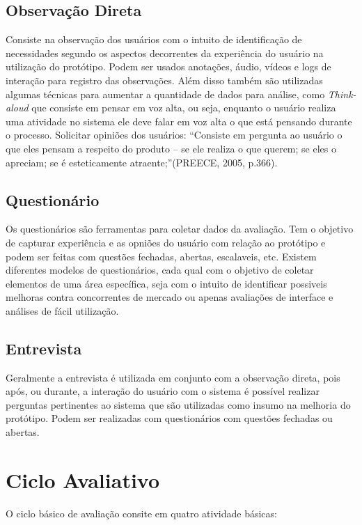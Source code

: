 \subsection{Observação Direta}

Consiste na observação dos usuários com o intuito de identificação de necessidades segundo os aspectos decorrentes da experiência do usuário na utilização do protótipo. Podem ser usados anotações, áudio, vídeos e logs de interação para registro das observações. Além disso também são utilizadas algumas técnicas para aumentar a quantidade de dados para análise, como \textit{Think-aloud} que consiste em pensar em voz alta, ou seja, enquanto o usuário realiza uma atividade no sistema ele deve falar em voz alta o que está pensando durante o processo. Solicitar opiniões dos usuários: “Consiste em pergunta ao usuário o que eles pensam a respeito do produto – se ele realiza o que querem; se eles o apreciam; se é esteticamente atraente;”(PREECE, 2005, p.366).

\subsection{Questionário}

Os questionários são ferramentas para coletar dados da avaliação. Tem o objetivo de capturar experiência e as opniões do usuário com relação ao protótipo e podem ser feitas com questões fechadas, abertas, escalaveis, etc. Existem diferentes modelos de questionários, cada qual com o objetivo de coletar elementos de uma área específica, seja com o intuito de identificar possiveis melhoras contra concorrentes de mercado ou apenas avaliações de interface e análises de fácil utilização.

\subsection{Entrevista}

Geralmente a entrevista é utilizada em conjunto com a observação direta, pois após, ou durante, a interação do usuário com o sistema é possível realizar perguntas pertinentes ao sistema que são utilizadas como insumo na melhoria do protótipo. Podem ser realizadas com questionários com questões fechadas ou abertas.

\section{Ciclo Avaliativo}

O ciclo básico de avaliação consite em quatro atividade básicas:

